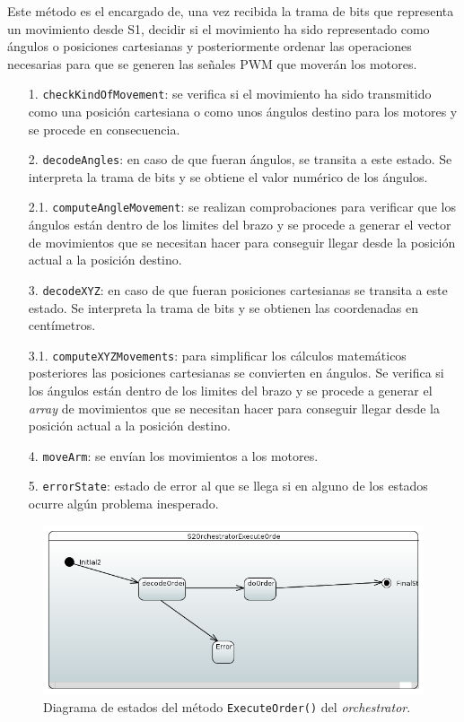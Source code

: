 Este método es el encargado de, una vez recibida la trama de bits que representa un movimiento desde S1, decidir si el movimiento ha sido representado como ángulos o posiciones cartesianas y posteriormente ordenar las operaciones necesarias para que se generen las señales \ac{PWM} que moverán los motores.

\begin{enumerate}
    \item[1.] \texttt{checkKindOfMovement}: se verifica si el movimiento ha sido transmitido como una posición cartesiana o como unos ángulos destino para los motores y se procede en consecuencia.
    \item[2.] \texttt{decodeAngles}: en caso de que fueran ángulos, se transita a este estado. Se interpreta la trama de bits y se obtiene el valor numérico de los ángulos.
    \item[2.1.] \texttt{computeAngleMovement}: se realizan comprobaciones para verificar que los ángulos están dentro de los limites del brazo y se procede a generar el vector de movimientos que se necesitan hacer para conseguir llegar desde la posición actual a la posición destino.
    \item[3.] \texttt{decodeXYZ}: en caso de que fueran posiciones cartesianas se transita a este estado. Se interpreta la trama de bits y se obtienen las coordenadas en centímetros.
    \item[3.1.] \texttt{computeXYZMovements}: para simplificar los cálculos matemáticos posteriores las posiciones cartesianas se convierten en ángulos. Se verifica si los ángulos están dentro de los limites del brazo y se procede a generar el \textit{array} de movimientos que se necesitan hacer para conseguir llegar desde la posición actual a la posición destino.
    \item[4.] \texttt{moveArm}: se envían los movimientos a los motores.
    \item[5.] \texttt{errorState}: estado de error al que se llega si en alguno de los estados ocurre algún problema inesperado. 
\end{enumerate}

\begin{figure}[H]
    \centering
    \includegraphics[width=1\linewidth]{pictures/S2OrchestratorExecuteOrder.PNG}
    \caption{Diagrama de estados del método \texttt{ExecuteOrder()} del \textit{orchestrator}.}
    \label{fig:fun_execute_order_orchestator}
\end{figure}

